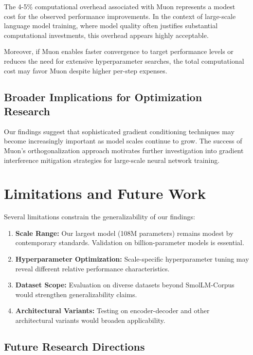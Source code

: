 \documentclass[11pt,a4paper]{article}
\begin{document}
The 4-5\% computational overhead associated with Muon represents a modest cost for the observed performance improvements. In the context of large-scale language model training, where model quality often justifies substantial computational investments, this overhead appears highly acceptable.

Moreover, if Muon enables faster convergence to target performance levels or reduces the need for extensive hyperparameter searches, the total computational cost may favor Muon despite higher per-step expenses.

\subsection{Broader Implications for Optimization Research}

Our findings suggest that sophisticated gradient conditioning techniques may become increasingly important as model scales continue to grow. The success of Muon's orthogonalization approach motivates further investigation into gradient interference mitigation strategies for large-scale neural network training.

\section{Limitations and Future Work}

Several limitations constrain the generalizability of our findings:

\begin{enumerate}[leftmargin=*]
    \item \textbf{Scale Range:} Our largest model (108M parameters) remains modest by contemporary standards. Validation on billion-parameter models is essential.
    \item \textbf{Hyperparameter Optimization:} Scale-specific hyperparameter tuning may reveal different relative performance characteristics.
    \item \textbf{Dataset Scope:} Evaluation on diverse datasets beyond SmolLM-Corpus would strengthen generalizability claims.
    \item \textbf{Architectural Variants:} Testing on encoder-decoder and other architectural variants would broaden applicability.
\end{enumerate}

\subsection{Future Research Directions}
\end{document}
